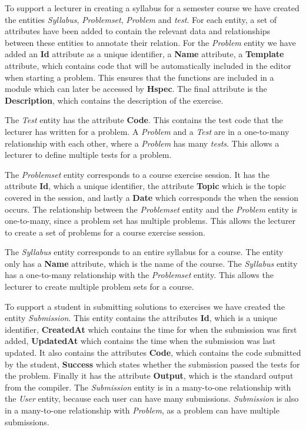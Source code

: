 To support a lecturer in creating a syllabus for a semester course we have created the entities \textit{Syllabus}, \textit{Problemset}, \textit{Problem} and \textit{test}. For each entity, a set of attributes have been added to contain the relevant data and relationships between these entities to annotate their relation.
For the \textit{Problem} entity we have added an \textbf{Id} attribute as a unique identifier, a \textbf{Name} attribute, a \textbf{Template} attribute, which contains code that will be automatically included in the editor when starting a problem. This ensures that the functions are included in a module which can later be accessed by \textbf{Hspec}. The final attribute is the \textbf{Description}, which contains the description of the exercise.

The \textit{Test} entity has the attribute \textbf{Code}. This contains the test code that the lecturer has written for a problem. A \textit{Problem} and a \textit{Test} are in a one-to-many relationship with each other, where a \textit{Problem} has many \textit{tests}. This allows a lecturer to define multiple tests for a problem.

The \textit{Problemset} entity corresponds to a course exercise session. It has the attribute \textbf{Id}, which a unique identifier, the attribute \textbf{Topic} which is the topic covered in the session, and lastly a \textbf{Date} which corresponds the when the session occurs. The relationship between the \textit{Problemset} entity and the \textit{Problem} entity is one-to-many, since a problem set has multiple problems. This allows the lecturer to create a set of problems for a course exercise session.

The \textit{Syllabus} entity corresponds to an entire syllabus for a course. The entity only has a \textbf{Name} attribute, which is the name of the course. The \textit{Syllabus} entity has a one-to-many relationship with the \textit{Problemset} entity. This allows the lecturer to create multiple problem sets for a course.

To support a student in submitting solutions to exercises we have created the entity \textit{Submission}. This entity contains the attributes \textbf{Id}, which is a unique identifier, \textbf{CreatedAt} which contains the time for when the submission was first added, \textbf{UpdatedAt} which contains the time when the submission was last updated. It also contains the attributes \textbf{Code}, which contains the code submitted by the student, \textbf{Success} which states whether the submission passed the tests for the problem. Finally it has the attribute \textbf{Output}, which is the standard output from the compiler.
The \textit{Submission} entity is in a many-to-one relationship with the \textit{User} entity, because each user can have many submissions. \textit{Submission} is also in a many-to-one relationship with \textit{Problem}, as a problem can have multiple submissions.

